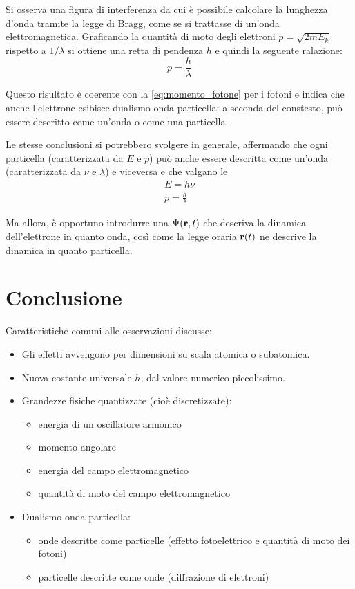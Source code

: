 Si osserva una figura di interferenza da cui è possibile calcolare la lunghezza d'onda tramite la legge di Bragg, come se si trattasse di un'onda elettromagnetica.
Graficando la quantità di moto degli elettroni $p = \sqrt{2 m E_k}$ rispetto a $1 / \lambda$ si ottiene una retta di pendenza $h$ e quindi la seguente ralazione:
\begin{equation}
    p = \frac{h}{\lambda}
\end{equation}

Questo risultato è coerente con la \eqref{eq:momento_fotone} per i fotoni e indica che anche l'elettrone esibisce dualismo onda-particella: a seconda del constesto, può essere descritto come un'onda o come una particella.

Le stesse conclusioni si potrebbero svolgere in generale, affermando che ogni particella (caratterizzata da $E$ e $p$) può anche essere descritta come un'onda (caratterizzata da $\nu$ e $\lambda$) e viceversa e che valgano le 
\begin{subequations}
\begin{gather}
    E = h \nu \\
    p = \frac{h}{\lambda}
\end{gather}
\end{subequations}

Ma allora, è opportuno introdurre una  $\Psi(\mathbf{r}, t)$ che descriva la dinamica dell'elettrone in quanto onda, così come la legge oraria $\mathbf{r}(t)$ ne descrive la dinamica in quanto particella.


\section{Conclusione}

Caratteristiche comuni alle osservazioni discusse:
\begin{itemize}
    \item Gli effetti avvengono per dimensioni su scala atomica o subatomica.
    \item Nuova costante universale $h$, dal valore numerico piccolissimo.
    \item Grandezze fisiche quantizzate (cioè discretizzate):
    \begin{itemize}
        \item energia di un oscillatore armonico
        \item momento angolare
        \item energia del campo elettromagnetico
        \item quantità di moto del campo elettromagnetico
    \end{itemize}
    \item Dualismo onda-particella:
    \begin{itemize}
        \item onde descritte come particelle (effetto fotoelettrico e quantità di moto dei fotoni)
        \item particelle descritte come onde (diffrazione di elettroni)
    \end{itemize}
\end{itemize}

